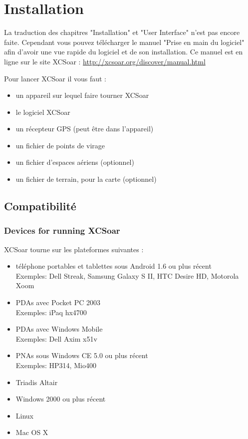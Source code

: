 \chapter{Installation}\label{cha:installation}

La traduction des chapitres "Installation" et "User Interface" n'est pas encore faite. Cependant vous pouvez télécharger le manuel "Prise en main du logiciel" afin d'avoir une vue rapide du logiciel et de son installation.
Ce manuel est en ligne sur le site XCSoar : {\href{http://xcsoar.org/discover/manual.html}{http://xcsoar.org/discover/manual.html}}


Pour lancer XCSoar il vous faut :

\begin{itemize}
\item un appareil sur lequel faire tourner XCSoar
\item le logiciel XCSoar
\item un récepteur GPS (peut être dans l'appareil)
\item un fichier de points de virage
\item un fichier d'espaces aériens (optionnel)
\item un fichier de terrain, pour la carte (optionnel)
\end{itemize}

\section{Compatibilité}

\subsection*{Devices for running XCSoar}

XCSoar tourne sur les plateformes suivantes :

\begin{itemize}
\item téléphone portables et tablettes sous Android 1.6 ou plus récent \\
  Exemples: Dell Streak, Samsung Galaxy S II, HTC Desire HD,
  Motorola Xoom
\item PDAs avec Pocket PC 2003 \\
  Exemples: iPaq hx4700
\item PDAs avec Windows Mobile \\
  Exemples: Dell Axim x51v
\item PNAs sous Windows CE 5.0 ou plus récent \\
  Exemples: HP314, Mio400
\item Triadis Altair
\item Windows 2000 ou plus récent
\item Linux
\item Mac OS X
\end{itemize}

